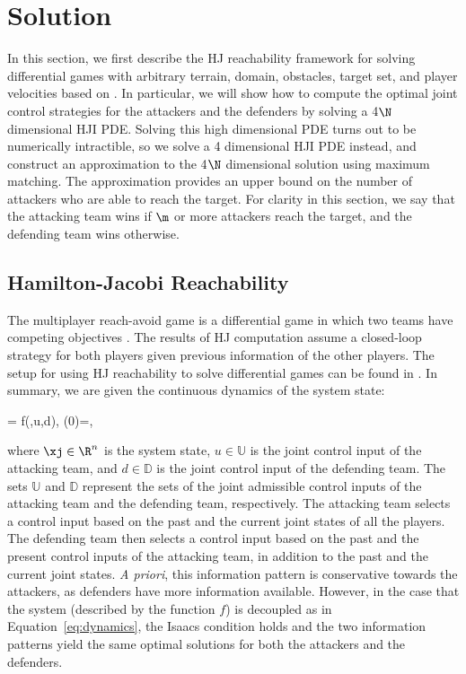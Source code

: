 \section{Solution} \label{sec:solution}
In this section, we first describe the HJ reachability framework for solving differential games with arbitrary terrain, domain, obstacles, target set, and player velocities based on \cite{j:mitchell-TAC-2005, LSToolbox, Huang2011}. In particular, we will show how to compute the optimal joint control strategies for the attackers and the defenders by solving a 4$\N$ dimensional HJI PDE. Solving this high dimensional PDE turns out to be numerically intractible, so we solve a 4 dimensional HJI PDE instead, and construct an approximation to the 4$\N$ dimensional solution using maximum matching. The approximation provides an upper bound on the number of attackers who are able to reach the target. For clarity in this section, we say that the attacking team wins if $\m$ or more attackers reach the target, and the defending team wins otherwise.

\subsection{Hamilton-Jacobi Reachability} \label{subsec:hj_background}
The multiplayer reach-avoid game is a differential game in which two teams have competing objectives \cite{b:basar-olsder-1999}. The results of HJ computation assume a closed-loop strategy for both players given previous information of the other players. The setup for using HJ reachability to solve differential games can be found in \cite{j:mitchell-TAC-2005, LSToolbox, Huang2011}. In summary, we are given the continuous dynamics of the system state:

\bq
\dxj = f(\xj,u,d), \xj(0)=\xjn,
\eq

\noindent where $\xj\in\R^n$ is the system state, $u\in\mathbb{U}$ is the joint control input of the attacking team, and $d\in\mathbb{D}$ is the joint control input of the defending team. The sets $\mathbb{U}$ and $\mathbb{D}$ represent the sets of the joint admissible control inputs of the attacking team and the defending team, respectively. The attacking team selects a control input based on the past and the current joint states of all the players. The defending team then selects a control input based on the past and the present control inputs of the attacking team, in addition to
the past and the current joint states. \textit{A priori}, this information pattern is conservative towards the attackers, as defenders have more information available. However, in the case that the system (described by the function $f$) is decoupled as in Equation~\eqref{eq:dynamics}, the Isaacs condition \cite{b:isaacs-1967} holds and the two information patterns yield the same optimal solutions for both the attackers and the defenders.

